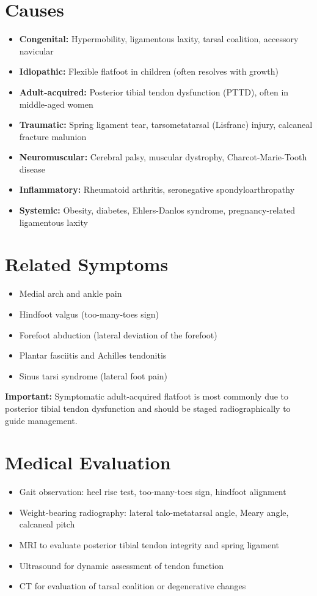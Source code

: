 \section*{Causes}
\begin{itemize}
  \item \textbf{Congenital:} Hypermobility, ligamentous laxity, tarsal coalition, accessory navicular
  \item \textbf{Idiopathic:} Flexible flatfoot in children (often resolves with growth)
  \item \textbf{Adult-acquired:} Posterior tibial tendon dysfunction (PTTD), often in middle-aged women
  \item \textbf{Traumatic:} Spring ligament tear, tarsometatarsal (Lisfranc) injury, calcaneal fracture malunion
  \item \textbf{Neuromuscular:} Cerebral palsy, muscular dystrophy, Charcot-Marie-Tooth disease
  \item \textbf{Inflammatory:} Rheumatoid arthritis, seronegative spondyloarthropathy
  \item \textbf{Systemic:} Obesity, diabetes, Ehlers-Danlos syndrome, pregnancy-related ligamentous laxity
\end{itemize}

\section*{Related Symptoms}
\begin{itemize}
  \item Medial arch and ankle pain
  \item Hindfoot valgus (too-many-toes sign)
  \item Forefoot abduction (lateral deviation of the forefoot)
  \item Plantar fasciitis and Achilles tendonitis
  \item Sinus tarsi syndrome (lateral foot pain)
\end{itemize}
\textbf{Important:} Symptomatic adult-acquired flatfoot is most commonly due to posterior tibial tendon dysfunction and should be staged radiographically to guide management.

\section*{Medical Evaluation}
\begin{itemize}
  \item Gait observation: heel rise test, too-many-toes sign, hindfoot alignment
  \item Weight-bearing radiography: lateral talo-metatarsal angle, Meary angle, calcaneal pitch
  \item MRI to evaluate posterior tibial tendon integrity and spring ligament
  \item Ultrasound for dynamic assessment of tendon function
  \item CT for evaluation of tarsal coalition or degenerative changes
\end{itemize}

